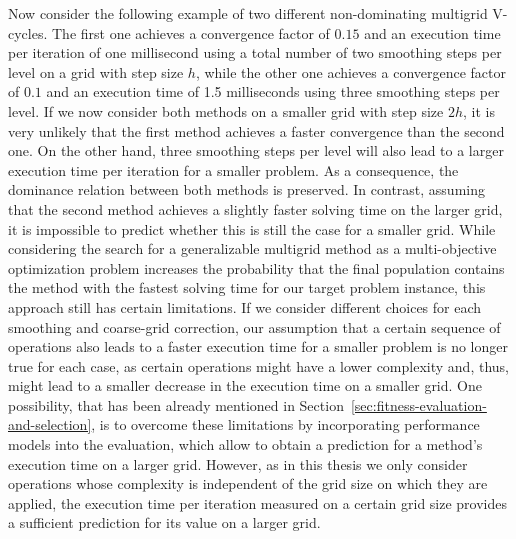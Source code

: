 Now consider the following example of two different non-dominating multigrid V-cycles.
The first one achieves a convergence factor of $0.15$ and an execution time per iteration of one millisecond using a total number of two smoothing steps per level on a grid with step size $h$, while the other one achieves a convergence factor of $0.1$ and an execution time of 1.5 milliseconds using three smoothing steps per level.
If we now consider both methods on a smaller grid with step size $2h$, it is very unlikely that the first method achieves a faster convergence than the second one.
On the other hand, three smoothing steps per level will also lead to a larger execution time per iteration for a smaller problem.
As a consequence, the dominance relation between both methods is preserved.
In contrast, assuming that the second method achieves a slightly faster solving time on the larger grid, it is impossible to predict whether this is still the case for a smaller grid.  
While considering the search for a generalizable multigrid method as a multi-objective optimization problem increases the probability that the final population contains the method with the fastest solving time for our target problem instance, this approach still has certain limitations.
If we consider different choices for each smoothing and coarse-grid correction, our assumption that a certain sequence of operations also leads to a faster execution time for a smaller problem is no longer true for each case, as certain operations might have a lower complexity and, thus, might lead to a smaller decrease in the execution time on a smaller grid.
One possibility, that has been already mentioned in Section~\ref{sec:fitness-evaluation-and-selection}, is to overcome these limitations by incorporating performance models into the evaluation, which allow to obtain a prediction for a method's execution time on a larger grid.
However, as in this thesis we only consider operations whose complexity is independent of the grid size on which they are applied, the execution time per iteration measured on a certain grid size provides a sufficient prediction for its value on a larger grid.

